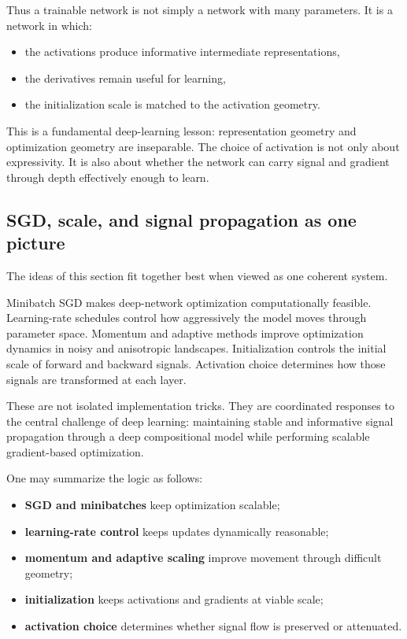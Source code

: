 \medskip

Thus a trainable network is not simply a network with many parameters.
It is a network in which:
\begin{itemize}
    \item the activations produce informative intermediate representations,
    \item the derivatives remain useful for learning,
    \item the initialization scale is matched to the activation geometry.
\end{itemize}

\medskip

This is a fundamental deep-learning lesson:
representation geometry and optimization geometry are inseparable.
The choice of activation is not only about expressivity.
It is also about whether the network can carry signal and gradient through depth effectively enough to learn.

\subsection*{SGD, scale, and signal propagation as one picture}

The ideas of this section fit together best when viewed as one coherent system.

\medskip

Minibatch SGD makes deep-network optimization computationally feasible.
Learning-rate schedules control how aggressively the model moves through parameter space.
Momentum and adaptive methods improve optimization dynamics in noisy and anisotropic landscapes.
Initialization controls the initial scale of forward and backward signals.
Activation choice determines how those signals are transformed at each layer.

\medskip

These are not isolated implementation tricks.
They are coordinated responses to the central challenge of deep learning:
maintaining stable and informative signal propagation through a deep compositional model while performing scalable gradient-based optimization.

\medskip

One may summarize the logic as follows:

\begin{itemize}
    \item \textbf{SGD and minibatches} keep optimization scalable;
    \item \textbf{learning-rate control} keeps updates dynamically reasonable;
    \item \textbf{momentum and adaptive scaling} improve movement through difficult geometry;
    \item \textbf{initialization} keeps activations and gradients at viable scale;
    \item \textbf{activation choice} determines whether signal flow is preserved or attenuated.
\end{itemize}

